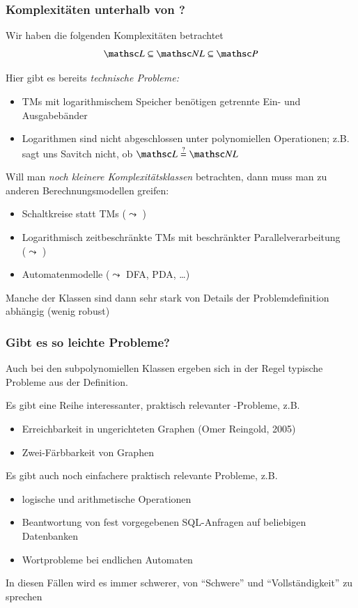 \documentclass[aspectratio=1610,onlymath]{beamer}
\begin{document}
\begin{frame}\frametitle{Komplexitäten unterhalb von \PTime?}

Wir haben die folgenden Komplexitäten betrachtet
\[\LogSpace \subseteq \NLogSpace \subseteq \PTime\]

Hier gibt es bereits \emph{technische Probleme:}
\begin{itemize}
\item TMs mit logarithmischem Speicher benötigen getrennte Ein- und Ausgabebänder
\item Logarithmen sind nicht abgeschlossen unter polynomiellen Operationen;
z.B. sagt uns Savitch \alert{nicht}, ob $\LogSpace \stackrel{?}{=} \NLogSpace$
\end{itemize}\pause\smallskip

Will man \emph{noch kleinere Komplexitätsklassen} betrachten, dann muss man zu anderen
Berechnungsmodellen greifen:
\begin{itemize}
\item Schaltkreise statt TMs ($\leadsto$ )
\item Logarithmisch zeitbeschränkte TMs mit beschränkter Parallelverarbeitung\\ ($\leadsto$ )
\item Automatenmodelle ($\leadsto$ DFA, PDA, \ldots)
\end{itemize}
Manche der Klassen sind dann sehr stark von Details der Problemdefinition
abhängig (wenig robust)

\end{frame}

\begin{frame}\frametitle{Gibt es so leichte Probleme?}

Auch bei den subpolynomiellen Klassen ergeben sich in der Regel typische Probleme
aus der Definition.
\bigskip\pause

Es gibt eine Reihe \alert{interessanter, praktisch relevanter \LogSpace-Probleme}, z.B.
\begin{itemize}
\item Erreichbarkeit in ungerichteten Graphen (Omer Reingold, 2005)
\item Zwei-Färbbarkeit von Graphen
\end{itemize}
\bigskip\pause

Es gibt auch \alert{noch einfachere praktisch relevante Probleme}, z.B.
\begin{itemize}
\item logische und arithmetische Operationen
\item Beantwortung von fest vorgegebenen SQL-Anfragen auf beliebigen Datenbanken
\item Wortprobleme bei endlichen Automaten
\end{itemize}

In diesen Fällen wird es immer schwerer, von "`Schwere"' und "`Vollständigkeit"' zu sprechen

\end{frame}
\end{document}
